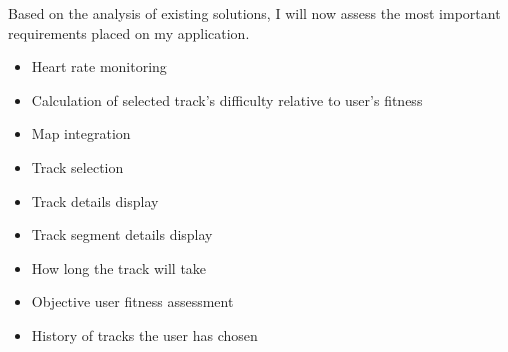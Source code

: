 \linebreak
Based on the analysis of existing solutions, I will now assess the most important requirements placed on my application.
\begin{itemize}
    \item Heart rate monitoring
    \item Calculation of selected track's difficulty relative to user's fitness
    \item Map integration
    \item Track selection
    \item Track details display
    \item Track segment details display
    \item How long the track will take 
    \item Objective user fitness assessment
    \item History of tracks the user has chosen
\end{itemize}
